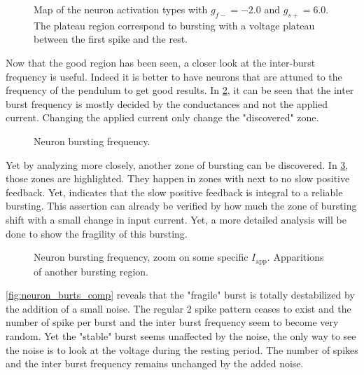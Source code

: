 \begin{figure}[!htb]
    \centering
    \caption{Map of the neuron activation types with $g_{f-} = -2.0$ and $g_{s+} = 6.0$. The plateau region correspond to bursting with a voltage plateau between the first spike and the rest.}
    \label{fig:neuron_activation}
\end{figure}

Now that the good region has been seen, a closer look at the inter-burst frequency is useful. Indeed it is better to have neurons that are attuned to the frequency of the pendulum to get good results. In \cref{fig:neuron_burts}, it can be seen that the inter burst frequency is mostly decided by the conductances and not the applied current. Changing the applied current only change the "discovered" zone.

\begin{figure}[!htb]
    \centering
    \caption{Neuron bursting frequency.}
    \label{fig:neuron_burts}
\end{figure}

Yet by analyzing more closely, another zone of bursting can be discovered. In \cref{fig:neuron_burts_fragile}, those zones are highlighted. They happen in zones with next to no slow positive feedback. Yet,\citet{burstingSlowFeedback} indicates that the slow positive feedback is integral to a reliable bursting. This assertion can already be verified by how much the zone of bursting shift with  a small change in input current. Yet, a more detailed analysis will be done to show the fragility of this bursting.

\begin{figure}[!htb]
    \centering
    \caption{Neuron bursting frequency, zoom on some specific $I_\text{app}$. Apparitions of another bursting region.}
    \label{fig:neuron_burts_fragile}
\end{figure}

\cref{fig:neuron_burts_comp} reveals that the "fragile" burst is totally destabilized by the addition of a small noise. The regular 2 spike pattern ceases to exist and the number of spike per burst and the inter burst frequency seem to become very random. 
Yet the "stable" burst seems unaffected by the noise, the only way to see the noise is to look at the voltage during the resting period. The number of spikes and the inter burst frequency remains unchanged by the added noise. 

